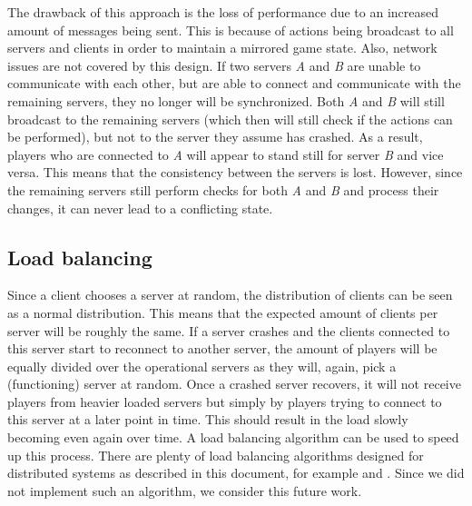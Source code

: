 		The drawback of this approach is the loss of performance due to an increased amount of messages being sent. 
		This is because of actions being broadcast to all servers and clients in order to maintain a mirrored game state. 
		Also, network issues are not covered by this design. 
		If two servers \emph{A} and \emph{B} are unable to communicate with each other, but are able to connect and communicate with the remaining servers, they no longer will be synchronized. 
		Both \emph{A} and \emph{B} will still broadcast to the remaining servers (which then will still check if the actions can be performed), but not to the server they assume has crashed. 
		As a result, players who are connected to \emph{A} will appear to stand still for server \emph{B} and vice versa. 
		This means that the consistency between the servers is lost. 
		However, since the remaining servers still perform checks for both \emph{A} and \emph{B} and process their changes, it can never lead to a conflicting state.
	
	\subsection{Load balancing}
	\label{subsec:load_balancing}
		Since a client chooses a server at random, the distribution of clients can be seen as a normal distribution. 
		This means that the expected amount of clients per server will be roughly the same.
		If a server crashes and the clients connected to this server start to reconnect to another server, the amount of players will be equally divided over the operational servers as they will, again, pick a (functioning) server at random.
		Once a crashed server recovers, it will not receive players from heavier loaded servers but simply by players trying to connect to this server at a later point in time. 
		This should result in the load slowly becoming even again over time. 
		A load balancing algorithm can be used to speed up this process.
		There are plenty of load balancing algorithms designed for distributed systems as described in this document, for example \cite{wolff2001dynamic} and \cite{ballard2000client}. Since we did not implement such an algorithm, we consider this future work.
		
